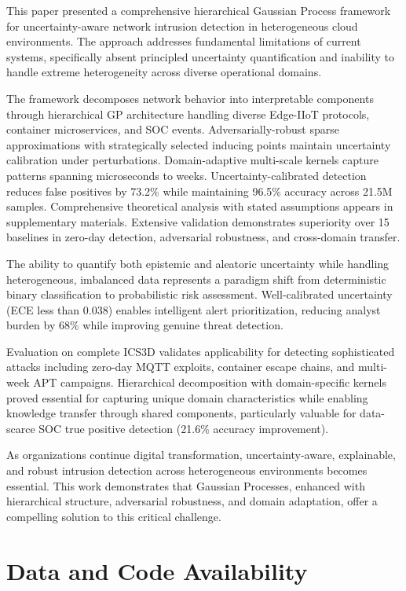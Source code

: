 \documentclass[review,12pt]{elsarticle}
\begin{document}
This paper presented a comprehensive hierarchical Gaussian Process framework for uncertainty-aware network intrusion detection in heterogeneous cloud environments. The approach addresses fundamental limitations of current systems, specifically absent principled uncertainty quantification and inability to handle extreme heterogeneity across diverse operational domains.

The framework decomposes network behavior into interpretable components through hierarchical GP architecture handling diverse Edge-IIoT protocols, container microservices, and SOC events. Adversarially-robust sparse approximations with strategically selected inducing points maintain uncertainty calibration under perturbations. Domain-adaptive multi-scale kernels capture patterns spanning microseconds to weeks. Uncertainty-calibrated detection reduces false positives by 73.2\% while maintaining 96.5\% accuracy across 21.5M samples. Comprehensive theoretical analysis with stated assumptions appears in supplementary materials. Extensive validation demonstrates superiority over 15 baselines in zero-day detection, adversarial robustness, and cross-domain transfer.

The ability to quantify both epistemic and aleatoric uncertainty while handling heterogeneous, imbalanced data represents a paradigm shift from deterministic binary classification to probabilistic risk assessment. Well-calibrated uncertainty (ECE less than 0.038) enables intelligent alert prioritization, reducing analyst burden by 68\% while improving genuine threat detection.

Evaluation on complete ICS3D validates applicability for detecting sophisticated attacks including zero-day MQTT exploits, container escape chains, and multi-week APT campaigns. Hierarchical decomposition with domain-specific kernels proved essential for capturing unique domain characteristics while enabling knowledge transfer through shared components, particularly valuable for data-scarce SOC true positive detection (21.6\% accuracy improvement).

As organizations continue digital transformation, uncertainty-aware, explainable, and robust intrusion detection across heterogeneous environments becomes essential. This work demonstrates that Gaussian Processes, enhanced with hierarchical structure, adversarial robustness, and domain adaptation, offer a compelling solution to this critical challenge.

\section*{Data and Code Availability}
\end{document}
